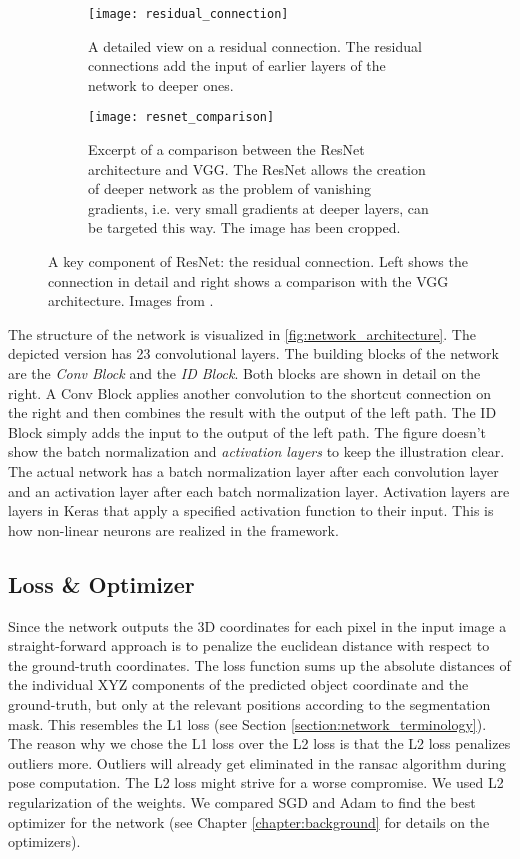 \begin{figure}[!tbp]
	\centering
	\begin{subfigure}[t]{0.47\textwidth}
		\centering
    	\texttt{[image: residual\_connection]}
    	\caption{A detailed view on a residual connection. The residual connections add the input of earlier layers of the network to deeper ones.}
    	\label{fig:residual_connection}
	\end{subfigure}
	\hfill
	\begin{subfigure}[t]{0.47\textwidth}
		\centering
    	\texttt{[image: resnet\_comparison]}
    	\caption{Excerpt of a comparison between the ResNet architecture and VGG. The ResNet allows the creation of deeper network as the problem of vanishing gradients, i.e. very small gradients at deeper layers, can be targeted this way. The image has been cropped.}
    	\label{fig:resnet_comparison}
	\end{subfigure}
	\caption{A key component of ResNet: the residual connection. Left shows the connection in detail and right shows a comparison with the VGG architecture. Images from \cite{resnet}.}
	\label{fig:resnet_details}
\end{figure} 

The structure of the network is visualized in \fig \ref{fig:network_architecture}. The depicted version has 23 convolutional layers. The building blocks of the network are the \textit{Conv Block} and the \textit{ID Block}. Both blocks are shown in detail on the right. A Conv Block applies another convolution to the shortcut connection on the right and then combines the result with the output of the left path. The ID Block simply adds the input to the output of the left path. The figure doesn't show the batch normalization and \textit{activation layers} to keep the illustration clear. The actual network has a batch normalization layer after each convolution layer and an activation layer after each batch normalization layer. Activation layers are layers in Keras that apply a specified activation function to their input. This is how non-linear neurons are realized in the framework.

\subsection{Loss \& Optimizer}

Since the network outputs the 3D coordinates for each pixel in the input image a straight-forward approach is to penalize the euclidean distance with respect to the ground-truth coordinates. The loss function sums up the absolute distances of the individual XYZ components of the predicted object coordinate and the ground-truth, but only at the relevant positions according to the segmentation mask. This resembles the L1 loss (see Section \ref{section:network_terminology}). The reason why we chose the L1 loss over the L2 loss is that the L2 loss penalizes outliers more. Outliers will already get eliminated in the \gls{ransac} algorithm during pose computation. The L2 loss might strive for a worse compromise. We used L2 regularization of the weights. We compared SGD and Adam to find the best optimizer for the network (see Chapter \ref{chapter:background} for details on the optimizers).

